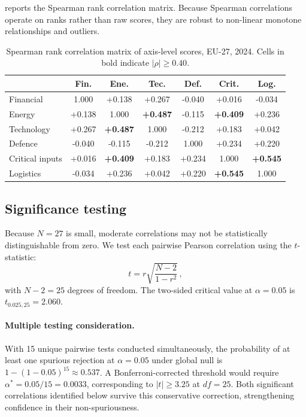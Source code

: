  reports the Spearman rank correlation matrix.
Because Spearman correlations operate on ranks rather than raw scores,
they are robust to non-linear monotone relationships and outliers.

\begin{table}[htbp]
\centering
\caption{Spearman rank correlation matrix of axis-level scores,
  EU-27, 2024.  Cells in bold indicate $|\rho| \geq 0.40$.}
\label{tab:corr-spearman}
\small
\setlength{\tabcolsep}{4pt}
\begin{tabular*}{\textwidth}{@{\extracolsep{\fill}} l S S S S S S @{}}
\toprule
 & {\textbf{Fin.}} & {\textbf{Ene.}} & {\textbf{Tec.}}
 & {\textbf{Def.}} & {\textbf{Crit.}} & {\textbf{Log.}} \\
\midrule
Financial       & {1.000} & +0.138 & +0.267 & -0.040 & +0.016 & -0.034 \\
Energy          & +0.138 & {1.000} & \textbf{+0.487} & -0.115 & \textbf{+0.409} & +0.236 \\
Technology      & +0.267 & \textbf{+0.487} & {1.000} & -0.212 & +0.183 & +0.042 \\
Defence         & -0.040 & -0.115 & -0.212 & {1.000} & +0.234 & +0.220 \\
Critical inputs & +0.016 & \textbf{+0.409} & +0.183 & +0.234 & {1.000} & \textbf{+0.545} \\
Logistics       & -0.034 & +0.236 & +0.042 & +0.220 & \textbf{+0.545} & {1.000} \\
\bottomrule
\end{tabular*}
\end{table}

\subsection{Significance testing}\label{sec:corr-tstat}

Because $N = 27$ is small, moderate correlations may not be
statistically distinguishable from zero.  We test each pairwise
Pearson correlation using the $t$-statistic:
\begin{equation}\label{eq:corr-t}
  t = r \sqrt{\frac{N - 2}{1 - r^2}}\,,
\end{equation}
with $N - 2 = 25$ degrees of freedom.  The two-sided critical value
at $\alpha = 0.05$ is $t_{0.025,25} = 2.060$.

\paragraph{Multiple testing consideration.}
With 15 unique pairwise tests conducted simultaneously, the
probability of at least one spurious rejection at $\alpha = 0.05$
under global null is $1 - (1-0.05)^{15} \approx 0.537$.  A
Bonferroni-corrected threshold would require $\alpha^{*} =
0.05/15 = 0.0033$, corresponding to $|t| \geq 3.25$ at
$df = 25$.  Both significant correlations identified below
survive this conservative correction, strengthening confidence
in their non-spuriousness.

